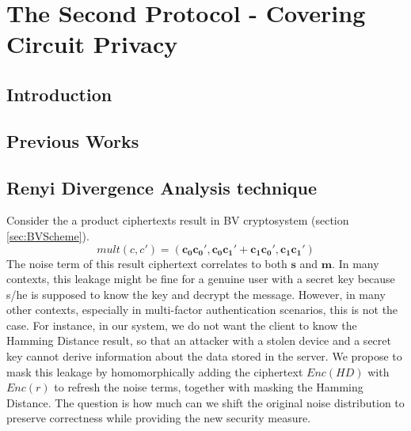 \chapter{The Second Protocol - Covering Circuit Privacy}

\ifpdf
    \graphicspath{{Chapter4/Figs/Raster/}{Chapter4/Figs/PDF/}{Chapter4/Figs/}}
\else
    \graphicspath{{Chapter4/Figs/Vector/}{Chapter4/Figs/}}
\fi

\section{Introduction}
\label{sec:secProcIntro}

\section{Previous Works}
\label{sec:secProcPrevious}

\section{Renyi Divergence Analysis technique}
\label{sec:secProcRenyi}
Consider the a product ciphertexts result in BV cryptosystem (section \ref{sec:BVScheme}).
\[
mult(c,c') = (\mathbf{c_0}\mathbf{c_0'}, \mathbf{c_0}\mathbf{c_1'} + \mathbf{c_1}\mathbf{c_0'}, \mathbf{c_1}\mathbf{c_1'})
\]
The noise term of this result ciphertext correlates to both $\mathbf{s}$ and $\mathbf{m}$.
In many contexts, this leakage might be fine for a genuine user with a secret key because s/he is supposed to know the key and decrypt the message.
However, in many other contexts, especially in multi-factor authentication
scenarios, this is not the case. For instance, in our system, we do not want the
client to know the Hamming Distance result, so that an attacker with a stolen
device and a secret key cannot derive information about the data stored in the
server. We propose to mask this leakage by homomorphically adding the ciphertext
$Enc(HD)$ with $Enc(r)$ to refresh the noise terms, together with masking the Hamming Distance. The question is how much can
we shift the original noise distribution to preserve correctness while providing
the new security measure.

